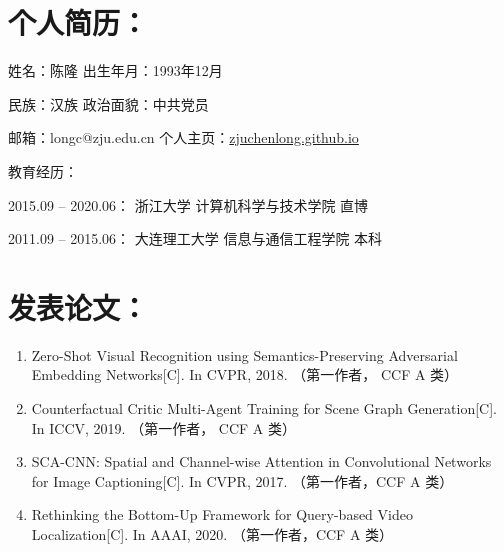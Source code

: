 \begin{publications}
\section*{个人简历：}
姓名：陈隆 \qquad\qquad\qquad\qquad\qquad\qquad 出生年月：1993年12月

民族：汉族 \qquad\qquad\qquad\qquad\qquad\qquad 政治面貌：中共党员

邮箱：longc@zju.edu.cn \qquad\qquad\qquad\hspace{0.3em}  个人主页：\href{http://zjuchenlong.github.io}{zjuchenlong.github.io} 
 
\vspace{1.0em}
教育经历：
\begin{asparaitem}                                                
\item{2015.09 – 2020.06： \quad 浙江大学 \qquad\qquad 计算机科学与技术学院 \qquad       直博}
\item{2011.09 – 2015.06： \quad 大连理工大学 \qquad 信息与通信工程学院 \qquad\quad 本科}  
\end{asparaitem}

\section*{发表论文：}
\begin{enumerate}
\item{
Zero-Shot Visual Recognition using Semantics-Preserving Adversarial Embedding Networks[C].
In CVPR, 2018.
（第一作者， CCF A 类）
}

\item{
Counterfactual Critic Multi-Agent Training for Scene Graph Generation[C].
In ICCV, 2019.
（第一作者， CCF A 类）
}

\item{
SCA-CNN: Spatial and Channel-wise Attention in Convolutional Networks for Image Captioning[C].
In CVPR, 2017.
（第一作者，CCF A 类）
}

\item{
Rethinking the Bottom-Up Framework for Query-based Video Localization[C].
In AAAI, 2020.
（第一作者，CCF A 类）
}


\end{enumerate}
\end{publications}
